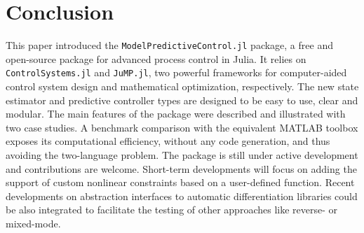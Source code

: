\section{Conclusion}

This paper introduced the \texttt{ModelPredictiveControl.jl} package, a free and open-source package for advanced process control in Julia. It relies on \texttt{ControlSystems.jl} and \texttt{JuMP.jl}, two powerful frameworks for computer-aided control system design and mathematical optimization, respectively. The new state estimator and predictive controller types are designed to be easy to use, clear and modular. The main features of the package were described and illustrated with two case studies. A benchmark comparison with the equivalent MATLAB toolbox exposes its computational efficiency, without any code generation, and thus avoiding the two-language problem. The package is still under active development and contributions are welcome. Short-term developments will focus on adding the support of custom nonlinear constraints based on a user-defined function. Recent developments on abstraction interfaces to automatic differentiation libraries could be also integrated to facilitate the testing of other approaches like reverse- or mixed-mode.